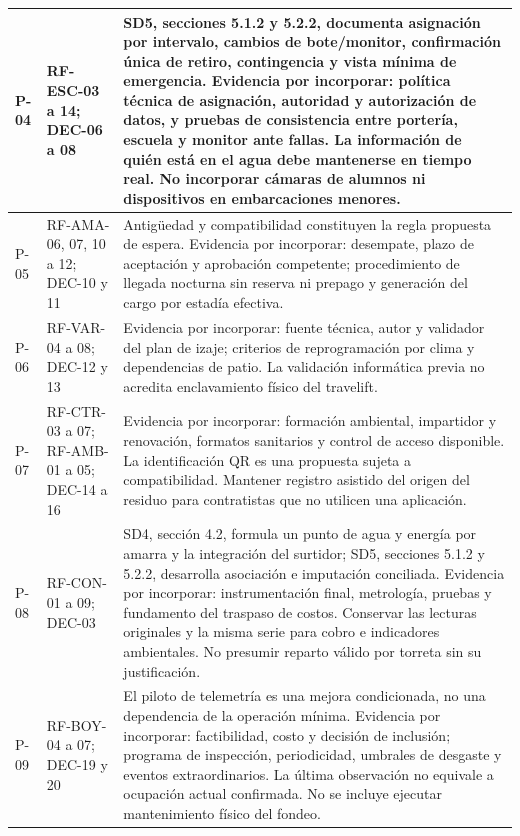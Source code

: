 \begin{longtable}{|L{0.057471\AnchoTablaAnexo}|L{0.199234\AnchoTablaAnexo}|L{0.743295\AnchoTablaAnexo}|}
P-04 & RF-ESC-03 a 14; DEC-06 a 08 & SD5, secciones 5.1.2 y 5.2.2, documenta asignación por intervalo, cambios de bote/monitor, confirmación única de retiro, contingencia y vista mínima de emergencia. Evidencia por incorporar: política técnica de asignación, autoridad y autorización de datos, y pruebas de consistencia entre portería, escuela y monitor ante fallas. La información de quién está en el agua debe mantenerse en tiempo real. No incorporar cámaras de alumnos ni dispositivos en embarcaciones menores. \\ \hline

P-05 & RF-AMA-06, 07, 10 a 12; DEC-10 y 11 & Antigüedad y compatibilidad constituyen la regla propuesta de espera. Evidencia por incorporar: desempate, plazo de aceptación y aprobación competente; procedimiento de llegada nocturna sin reserva ni prepago y generación del cargo por estadía efectiva. \\ \hline

P-06 & RF-VAR-04 a 08; DEC-12 y 13 & Evidencia por incorporar: fuente técnica, autor y validador del plan de izaje; criterios de reprogramación por clima y dependencias de patio. La validación informática previa no acredita enclavamiento físico del travelift. \\ \hline

P-07 & RF-CTR-03 a 07; RF-AMB-01 a 05; DEC-14 a 16 & Evidencia por incorporar: formación ambiental, impartidor y renovación, formatos sanitarios y control de acceso disponible. La identificación QR es una propuesta sujeta a compatibilidad. Mantener registro asistido del origen del residuo para contratistas que no utilicen una aplicación. \\ \hline

P-08 & RF-CON-01 a 09; DEC-03 & SD4, sección 4.2, formula un punto de agua y energía por amarra y la integración del surtidor; SD5, secciones 5.1.2 y 5.2.2, desarrolla asociación e imputación conciliada. Evidencia por incorporar: instrumentación final, metrología, pruebas y fundamento del traspaso de costos. Conservar las lecturas originales y la misma serie para cobro e indicadores ambientales. No presumir reparto válido por torreta sin su justificación. \\ \hline

P-09 & RF-BOY-04 a 07; DEC-19 y 20 & El piloto de telemetría es una mejora condicionada, no una dependencia de la operación mínima. Evidencia por incorporar: factibilidad, costo y decisión de inclusión; programa de inspección, periodicidad, umbrales de desgaste y eventos extraordinarios. La última observación no equivale a ocupación actual confirmada. No se incluye ejecutar mantenimiento físico del fondeo. \\ \hline


\end{longtable}
